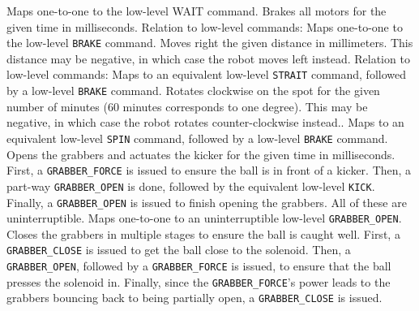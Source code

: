     {Maps one-to-one to the low-level WAIT command.}
    {Brakes all motors for the given time in milliseconds.}
    {Relation to low-level commands: Maps one-to-one to the low-level
     \texttt{BRAKE} command.}
    {Moves right the given distance in millimeters. This distance may be
     negative, in which case the robot moves left instead.}
    {Relation to low-level commands: Maps to an equivalent low-level
     \texttt{STRAIT} command, followed by a low-level \texttt{BRAKE} command.}
    {Rotates clockwise on the spot for the given number of minutes (60 minutes
     corresponds to one degree). This may be negative, in which case the robot
     rotates counter-clockwise instead..}
    {Maps to an equivalent low-level \texttt{SPIN} command, followed by a
     low-level \texttt{BRAKE} command.}
    {Opens the grabbers and actuates the kicker for the given time in
     milliseconds.}
    {First, a \texttt{GRABBER\_FORCE} is issued to ensure the ball is in front
     of a kicker. Then, a part-way \texttt{GRABBER\_OPEN} is done, followed by
     the equivalent low-level \texttt{KICK}. Finally, a \texttt{GRABBER\_OPEN}
     is issued to finish opening the grabbers. All of these are
     uninterruptible.}
    {Maps one-to-one to an uninterruptible low-level \texttt{GRABBER\_OPEN}.}
    {Closes the grabbers in multiple stages to ensure the ball is caught well.}
    {First, a \texttt{GRABBER\_CLOSE} is issued to get the ball close to the
     solenoid.  Then, a \texttt{GRABBER\_OPEN}, followed by a
     \texttt{GRABBER\_FORCE} is issued, to ensure that the ball presses the
     solenoid in. Finally, since the \texttt{GRABBER\_FORCE}'s power leads to
     the grabbers bouncing back to being partially open, a
     \texttt{GRABBER\_CLOSE} is issued.}
